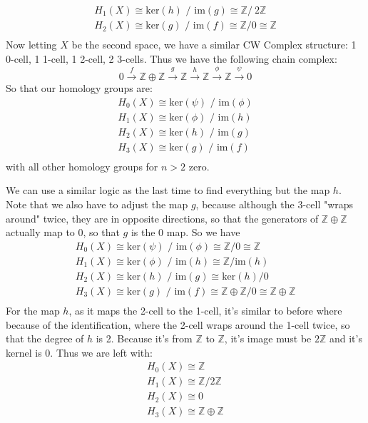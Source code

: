 \documentclass[12pt]{article}
\newcommand{\Z}{\mathbb{Z}}
\begin{document}
\begin{newproof}
\begin{align*}
    H_1(X) \cong \text{ker}(h) \text{ / im}(g) \cong \Z / \ 2\Z \\
    H_2(X) \cong \text{ker}(g) \text{ / im}(f) \cong \Z / 0 \cong \Z\\
  \end{align*}
  Now letting $X$ be the second space, we have a similar CW Complex structure: 1 0-cell, 1 1-cell, 1 2-cell, 2 3-cells. Thus we have the 
  following chain complex:
  $$ 0 \xrightarrow{f} \Z \oplus \Z \xrightarrow{g} \Z \xrightarrow{h} \Z \xrightarrow{\phi} \Z \xrightarrow{\psi} 0 $$
  So that our homology groups are:
  \begin{align*}
    H_0(X) \cong \text{ker}(\psi) \text{ / im}(\phi) \\
    H_1(X) \cong \text{ker}(\phi) \text{ / im}(h) \\
    H_2(X) \cong \text{ker}(h) \text{ / im}(g) \\
    H_3(X) \cong \text{ker}(g) \text{ / im}(f) \\
  \end{align*}
  with all other homology groups for $n > 2$ zero.
  \par We can use a similar logic as the last time to find everything but the map $h$. Note that we also have to adjust the map $g$, 
  because although the 3-cell "wraps around" twice,  they are in opposite directions, so that the generators of $\Z \oplus \Z$ actually 
  map to $0$, so that $g$ is the $0$ map. So we have 
  \begin{align*}
    H_0(X) \cong \text{ker}(\psi) \text{ / im}(\phi) \cong \Z / 0 \cong \Z \\
    H_1(X) \cong \text{ker}(\phi) \text{ / im}(h) \cong \Z /\text{im}(h) \\
    H_2(X) \cong \text{ker}(h) \text{ / im}(g) \cong \text{ker}(h) / 0 \\
    H_3(X) \cong \text{ker}(g) \text{ / im}(f) \cong \Z \oplus \Z / 0 \cong \Z \oplus \Z \\
  \end{align*}
  For the map $h$, as it maps the 2-cell to the 1-cell, it's similar to before where because of the identification, where the 
  2-cell wraps around the 1-cell twice, so that the degree of $h$ is 2. Because it's from $\Z$ to $\Z$, it's image must be $2 \Z$ 
  and it's kernel is $0$. Thus we are left with:
  \begin{align*}
    H_0(X) \cong \Z \\
    H_1(X) \cong \Z / 2 \Z \\
    H_2(X) \cong 0 \\
    H_3(X) \cong \Z \oplus \Z \\
  \end{align*}
\end{newproof}
\end{document}

